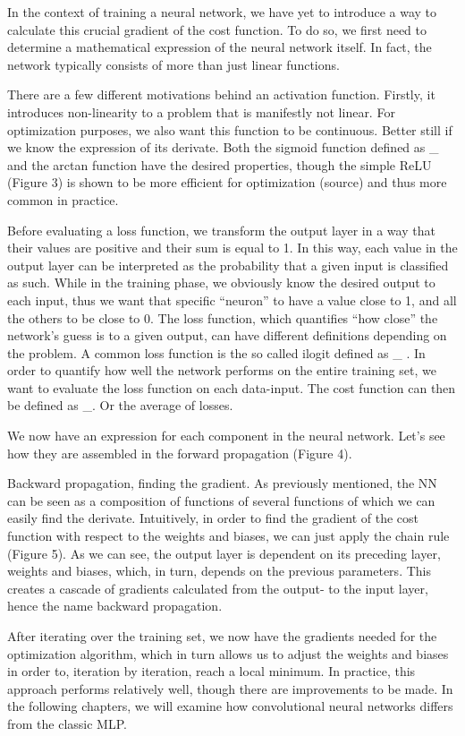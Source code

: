 In the context of training a neural network, we have yet to introduce a way to calculate this crucial gradient of the cost function.
To do so, we first need to determine a mathematical expression of the neural network itself.
In fact, the network typically consists of more than just linear functions. 
\stopsubsection
 

\startsubsection[title=Activation function] 
There are a few different motivations behind an activation function.
Firstly, it introduces non-linearity to a problem that is manifestly not linear.
For optimization purposes, we also want this function to be continuous.
Better still if we know the expression of its derivate.
Both the sigmoid function defined as _ and the arctan function have the desired properties, though the simple ReLU (Figure 3) is shown to be more efficient for optimization (source) and thus more common in practice. 
\stopsubsection

\startsubsection[title=Softmax, loss and cost function ]
Before evaluating a loss function, we transform the output layer in a way that their values are positive and their sum is equal to 1.
In this way, each value in the output layer can be interpreted as the probability that a given input is classified as such.
While in the training phase, we obviously know the desired output to each input, thus we want that specific “neuron” to have a value close to 1, and all the others to be close to 0.
The loss function, which quantifies “how close” the network’s guess is to a given output, can have different definitions depending on the problem.
A common loss function is the so called ilogit defined as _ .
In order to quantify how well the network performs on the entire training set, we want to evaluate the loss function on each data-input.
The cost function can then be defined as _.
Or the average of losses.
\stopsubsection

\startsubsection[title=Forward propagation]
We now have an expression for each component in the neural network.
Let’s see how they are assembled in the forward propagation (Figure 4).
\stopsubsection
 
\startsubsection[title=Backward propogation]
Backward propagation, finding the gradient. 
As previously mentioned, the NN can be seen as a composition of functions of several functions of which we can easily find the derivate.
Intuitively, in order to find the gradient of the cost function with respect to the weights and biases, we can just apply the chain rule (Figure 5).
As we can see, the output layer is dependent on its preceding layer, weights and biases, which, in turn, depends on the previous parameters.
This creates a cascade of gradients calculated from the output- to the input layer, hence the name backward propagation.  

After iterating over the training set, we now have the gradients needed for the optimization algorithm, which in turn allows us to adjust the weights and biases in order to, iteration by iteration, reach a local minimum.
In practice, this approach performs relatively well, though there are improvements to be made.
In the following chapters, we will examine how convolutional neural networks differs from the classic MLP. 
\stopsubsection
\stopsection